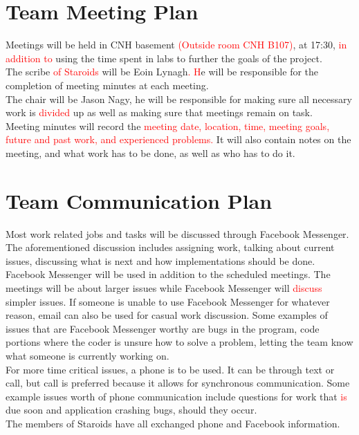 \documentclass{article}
\begin{document}
\section{Team Meeting Plan}
Meetings will be held in CNH basement \textcolor{red}{(Outside room CNH B107)}, at 17:30, \textcolor{red}{in addition to} using the time spent in labs to further the goals of the project.\\
The scribe \textcolor{red}{of Staroids} will be Eoin Lynagh\textcolor{red}{. H}e will be responsible for the completion of meeting minutes at each meeting.\\
The chair will be Jason Nagy, he will be responsible for making sure all necessary work is \textcolor{red}{divided} up as well as making sure that meetings remain on task.\\
Meeting minutes will record the \textcolor{red}{meeting date, location, time, meeting goals, future and past work, and experienced problems.} It will also contain notes on the meeting, and what work has to be done, as well as who has to do it.\\

\section{Team Communication Plan}
Most work related jobs and tasks will be discussed through Facebook Messenger. The aforementioned discussion includes assigning work, talking about current issues, discussing what is next and how implementations should be done. Facebook Messenger will be used in addition to the scheduled meetings. The meetings will be about larger issues while Facebook Messenger will \textcolor{red}{discuss} simpler issues. If someone is unable to use Facebook Messenger for whatever reason, email can also be used for casual work discussion. Some examples of issues that are Facebook Messenger worthy are bugs in the program, code portions where the coder is unsure how to solve a problem, letting the team know what someone is currently working on.\\
For more time critical issues, a phone is to be used. It can be through text or call, but call is preferred because it allows for synchronous communication. Some example issues worth of phone communication include questions for work that \textcolor{red}{is} due soon and application crashing bugs, should they occur.\\
The members of Staroids have all exchanged phone and Facebook information.\\
\end{document}
